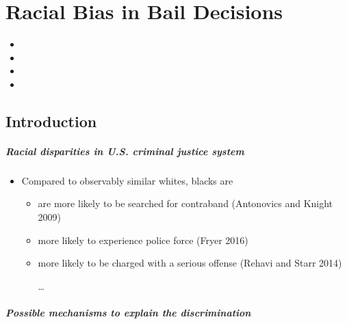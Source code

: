 \documentclass[../root]{subfiles}
\begin{document}
    \chapter{Racial Bias in Bail Decisions}

    \begin{shortsummary}
        \begin{itemize}
            \item {}
            \item {}
            \item {}
            \item {}
        \end{itemize}
    \end{shortsummary}

    \section{Introduction}
    \paragraph{Racial disparities in U.S. criminal justice system}

    \begin{itemize}
      \item Compared to observably similar whites, blacks are
      \begin{itemize}
        \item are more likely to be searched for contraband (Antonovics and Knight 2009)
        \item more likely to experience police force (Fryer 2016)
        \item more likely to be charged with a serious offense (Rehavi and Starr 2014)

        \ldots
      \end{itemize}
    \end{itemize}

    \paragraph{Possible mechanisms to explain the discrimination}
\end{document}
